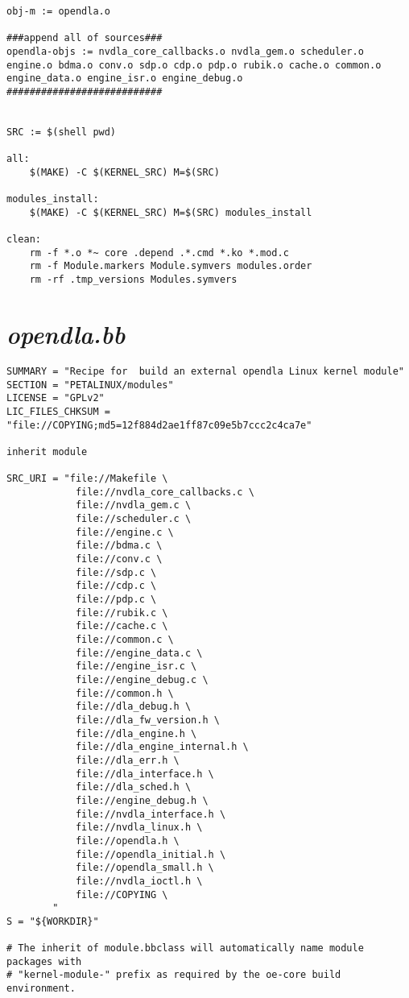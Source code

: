 \begin{lstlisting}
obj-m := opendla.o

###append all of sources###
opendla-objs := nvdla_core_callbacks.o nvdla_gem.o scheduler.o engine.o bdma.o conv.o sdp.o cdp.o pdp.o rubik.o cache.o common.o engine_data.o engine_isr.o engine_debug.o
###########################


SRC := $(shell pwd)

all:
    $(MAKE) -C $(KERNEL_SRC) M=$(SRC)

modules_install:
    $(MAKE) -C $(KERNEL_SRC) M=$(SRC) modules_install

clean:
    rm -f *.o *~ core .depend .*.cmd *.ko *.mod.c
    rm -f Module.markers Module.symvers modules.order
    rm -rf .tmp_versions Modules.symvers
\end{lstlisting}

\section{\emph{opendla.bb}}

\begin{lstlisting}
SUMMARY = "Recipe for  build an external opendla Linux kernel module"
SECTION = "PETALINUX/modules"
LICENSE = "GPLv2"
LIC_FILES_CHKSUM = "file://COPYING;md5=12f884d2ae1ff87c09e5b7ccc2c4ca7e"

inherit module

SRC_URI = "file://Makefile \
            file://nvdla_core_callbacks.c \
            file://nvdla_gem.c \
            file://scheduler.c \
            file://engine.c \
            file://bdma.c \
            file://conv.c \
            file://sdp.c \
            file://cdp.c \
            file://pdp.c \
            file://rubik.c \
            file://cache.c \
            file://common.c \
            file://engine_data.c \
            file://engine_isr.c \
            file://engine_debug.c \
            file://common.h \
            file://dla_debug.h \
            file://dla_fw_version.h \
            file://dla_engine.h \
            file://dla_engine_internal.h \
            file://dla_err.h \
            file://dla_interface.h \
            file://dla_sched.h \
            file://engine_debug.h \
            file://nvdla_interface.h \
            file://nvdla_linux.h \
            file://opendla.h \
            file://opendla_initial.h \
            file://opendla_small.h \
            file://nvdla_ioctl.h \
            file://COPYING \
        "
S = "${WORKDIR}"

# The inherit of module.bbclass will automatically name module packages with
# "kernel-module-" prefix as required by the oe-core build environment.
\end{lstlisting}

